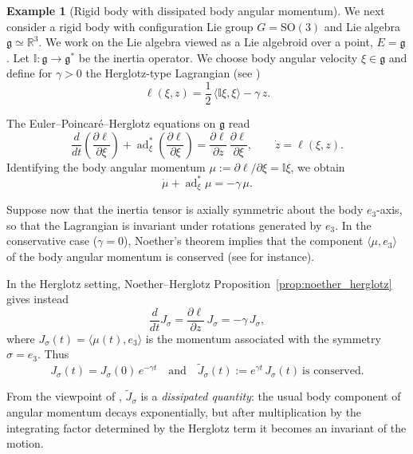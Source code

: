 \documentclass[11pt,a4paper]{article}
\theoremstyle{definition}
\newtheorem{example}[theorem]{Example}
\begin{document}
\begin{example}[Rigid body with dissipated body angular momentum]
We next consider a rigid body with configuration Lie group $G = \mathrm{SO}(3)$
and Lie algebra $\mathfrak{g} \simeq \mathbb{R}^3$.
We work on the Lie algebra viewed as a Lie algebroid over a point, $E=\mathfrak{g}$.
Let $\mathbb{I} \colon \mathfrak{g} \to \mathfrak{g}^*$ be the inertia operator.
We choose body angular velocity $\xi \in \mathfrak{g}$ and define for $\gamma>0$ the
Herglotz-type Lagrangian (see \cite{anahory2024reduction})
\[
\ell(\xi,z)
= \frac{1}{2}\,\langle \mathbb{I}\xi,\xi\rangle - \gamma\,z.
\]

The Euler--Poincaré--Herglotz equations on $\mathfrak{g}$ read
\[
\frac{d}{dt}\left(\frac{\partial \ell}{\partial \xi}\right)
+ \operatorname{ad}^*_{\xi}\!\left(\frac{\partial \ell}{\partial \xi}\right)
= \frac{\partial \ell}{\partial z}\,\frac{\partial \ell}{\partial \xi},
\qquad \dot z = \ell(\xi,z).
\]
Identifying the body angular momentum $\mu := \partial \ell/\partial \xi
= \mathbb{I}\xi$, we obtain
\[
\dot\mu + \operatorname{ad}^*_{\xi}\mu = -\gamma\,\mu.
\]

Suppose now that the inertia tensor is axially symmetric about the body $e_3$-axis,
so that the Lagrangian is invariant under rotations generated by $e_3$.
In the conservative case ($\gamma=0$), Noether's theorem implies that the
component $\langle \mu, e_3\rangle$ of the body angular momentum is conserved (see \cite{marsden2013introduction} for instance).

In the Herglotz setting, Noether--Herglotz Proposition~\ref{prop:noether_herglotz}
gives instead
\[
\frac{d}{dt} J_\sigma = \frac{\partial \ell}{\partial z}\,J_\sigma
= -\gamma\,J_\sigma,
\]
where $J_\sigma(t) = \langle \mu(t),e_3\rangle$ is the momentum associated with
the symmetry $\sigma=e_3$.
Thus
\[
J_\sigma(t) = J_\sigma(0)\,e^{-\gamma t}
\quad\text{and}\quad
\widetilde J_\sigma(t) := e^{\gamma t}\,J_\sigma(t)
\ \text{is conserved}.
\]

From the viewpoint of \cite{de2021symmetries}, $\widetilde J_\sigma$ is a
\emph{dissipated quantity}: the usual body component of angular momentum
decays exponentially, but after multiplication by the integrating factor
determined by the Herglotz term it becomes an invariant of the motion.
\end{example}
\end{document}
